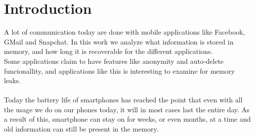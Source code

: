 \section{Introduction}
A lot of communication today are done with mobile applications like Facebook, GMail and Snapchat. In this work we analyze what information is stored in memory, and how long it is recoverable for the different applications. \\
Some applications claim to have features like anonymity and auto-delete funcionallity, and applications like this is interesting to examine for memory leaks. \\ \\
Today the battery life of smartphones has reached the point that even with all the usage we do on our phones today, it will in most cases last the entire day. As a result of this, smartphone can stay on for weeks, or even months, at a time and old information can still be present in the memory. 